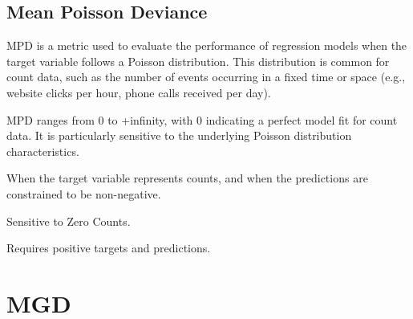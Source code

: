 \subsection{Mean Poisson Deviance}

MPD is a metric used to evaluate the performance of regression models when the target variable follows a Poisson distribution. This distribution is common for count data, such as the number
of events occurring in a fixed time or space (e.g., website clicks per hour, phone calls received per day).

\begin{center}
\end{center}

MPD ranges from 0 to +infinity, with 0 indicating a perfect model fit for count data. It is particularly sensitive to the underlying Poisson distribution characteristics.


When the target variable represents counts, and when the predictions are constrained to be non-negative.

{
    \item Sensitive to Zero Counts.
    \item Requires positive targets and predictions.
}

\clearpage
\thispagestyle{regressionstyle}
\section{MGD}
